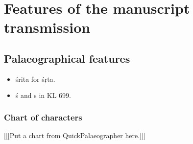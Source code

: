 \section{Features of the manuscript transmission}

\subsection{Palaeographical features}
\begin{itemize}
    \item śrita for śṛta.
    \item ś and s in KL 699.
\end{itemize}

\subsubsection{Chart of characters}

[[[Put a chart from QuickPalaeographer here.]]]

\newpage


